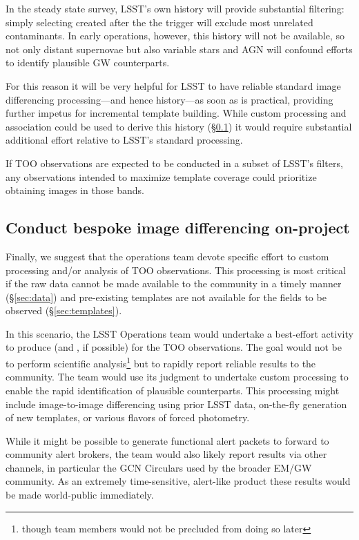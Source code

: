 \documentclass[DM,authoryear,toc]{lsstdoc}
\begin{document}
In the steady state survey, LSST's own history will provide substantial filtering: simply selecting \DIAObjects created after the the trigger will exclude most unrelated contaminants.
In early operations, however, this history will not be available, so not only distant supernovae but also variable stars and AGN will confound efforts to identify plausible GW counterparts.

For this reason it will be very helpful for LSST to have reliable standard image differencing processing---and hence history---as soon as is practical, providing further impetus for incremental template building.
While custom processing and association could be used to derive this history (\S \ref{sec:processing}) it would require substantial additional effort relative to LSST's standard processing.

If TOO observations are expected to be conducted in a subset of LSST's filters, any observations intended to maximize template coverage could prioritize obtaining images in those bands.

\subsection{Conduct bespoke image differencing on-project} \label{sec:processing}

Finally, we suggest that the operations team devote specific effort to custom processing and/or analysis of TOO observations.
This processing is most critical if the raw data cannot be made available to the community in a timely manner (\S \ref{sec:data}) and pre-existing templates are not available for the fields to be observed (\S \ref{sec:templates}).

In this scenario, the LSST Operations team would undertake a best-effort activity to produce \DIASources (and \DIAObjects, if possible) for the TOO observations.
The goal would not be to perform scientific analysis\footnote{though team members would not be precluded from doing so later} but to rapidly report reliable results to the community.
The team would use its judgment to undertake custom processing to enable the rapid identification of plausible counterparts.
This processing might include image-to-image differencing using prior LSST data, on-the-fly generation of new templates, or various flavors of forced photometry.

While it might be possible to generate functional alert packets to forward to community alert brokers, the team would also likely report results via other channels, in particular the GCN Circulars used by the broader EM/GW community.
As an extremely time-sensitive, alert-like product these results would be made world-public immediately.
\end{document}
